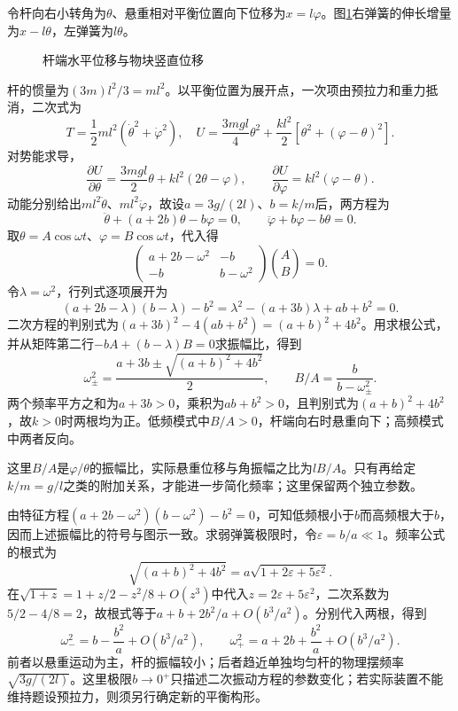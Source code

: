 \begin{solution}
令杆向右小转角为$\theta$、悬重相对平衡位置向下位移为$x=l\varphi$。图\ref{fig:hw4-7-s}右弹簧的伸长增量为$x-l\theta$，左弹簧为$l\theta$。

\begin{figure}[H]\centering
{}
\caption{杆端水平位移与物块竖直位移}\label{fig:hw4-7-s}
\end{figure}

杆的惯量为$(3m)l^2/3=ml^2$。以平衡位置为展开点，一次项由预拉力和重力抵消，二次式为
\[
 T=\frac12ml^2(\dot\theta^2+\dot\varphi^2),\quad
 U=\frac{3mgl}{4}\theta^2+\frac{kl^2}{2}[\theta^2+(\varphi-\theta)^2].
\]
对势能求导，
\[
\frac{\partial U}{\partial\theta}
=\frac{3mgl}{2}\theta+kl^2(2\theta-\varphi),\qquad
\frac{\partial U}{\partial\varphi}=kl^2(\varphi-\theta).
\]
动能分别给出$ml^2\ddot\theta$、$ml^2\ddot\varphi$，故设$a=3g/(2l)$、$b=k/m$后，两方程为
\[
\ddot\theta+(a+2b)\theta-b\varphi=0,\qquad
\ddot\varphi+b\varphi-b\theta=0.
\]
取$\theta=A\cos\omega t$、$\varphi=B\cos\omega t$，代入得
\[
 \begin{pmatrix}a+2b-\omega^2&-b\\-b&b-\omega^2\end{pmatrix}
 \binom{A}{B}=0.
\]
令$\lambda=\omega^2$，行列式逐项展开为
\[
(a+2b-\lambda)(b-\lambda)-b^2
=\lambda^2-(a+3b)\lambda+ab+b^2=0.
\]
二次方程的判别式为$(a+3b)^2-4(ab+b^2)=(a+b)^2+4b^2$。用求根公式，并从矩阵第二行$-bA+(b-\lambda)B=0$求振幅比，得到
\[
 \boxed{\omega_\pm^2=\frac{a+3b\pm\sqrt{(a+b)^2+4b^2}}2,
 \qquad B/A=\frac{b}{b-\omega_\pm^2}}.
\]
两个频率平方之和为$a+3b>0$，乘积为$ab+b^2>0$，且判别式为$(a+b)^2+4b^2$，故$k>0$时两根均为正。低频模式中$B/A>0$，杆端向右时悬重向下；高频模式中两者反向。

这里$B/A$是$\varphi/\theta$的振幅比，实际悬重位移与角振幅之比为$lB/A$。只有再给定$k/m=g/l$之类的附加关系，才能进一步简化频率；这里保留两个独立参数。


由特征方程$(a+2b-\omega^2)(b-\omega^2)-b^2=0$，可知低频根小于$b$而高频根大于$b$，因而上述振幅比的符号与图示一致。求弱弹簧极限时，令$\varepsilon=b/a\ll1$。频率公式的根式为
\[
\sqrt{(a+b)^2+4b^2}=a\sqrt{1+2\varepsilon+5\varepsilon^2}.
\]
在$\sqrt{1+z}=1+z/2-z^2/8+O(z^3)$中代入$z=2\varepsilon+5\varepsilon^2$，二次系数为$5/2-4/8=2$，故根式等于$a+b+2b^2/a+O(b^3/a^2)$。分别代入两根，得到
\[
 \omega_-^2=b-\frac{b^2}{a}+O(b^3/a^2),\qquad
 \omega_+^2=a+2b+\frac{b^2}{a}+O(b^3/a^2).
\]
前者以悬重运动为主，杆的振幅较小；后者趋近单独均匀杆的物理摆频率$\sqrt{3g/(2l)}$。这里极限$b\to0^+$只描述二次振动方程的参数变化；若实际装置不能维持题设预拉力，则须另行确定新的平衡构形。

\end{solution}
